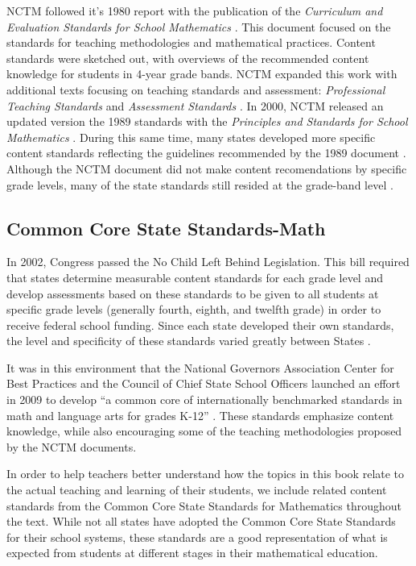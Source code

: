 \documentclass[
]{book}
\theoremstyle{definition}
\theoremstyle{definition}
\theoremstyle{definition}
\theoremstyle{definition}
\theoremstyle{remark}
\begin{document}
NCTM followed it's 1980 report with the publication of the \emph{Curriculum and Evaluation Standards for School Mathematics} \citep{NCTM1989}. This document focused on the standards for teaching methodologies and mathematical practices. Content standards were sketched out, with overviews of the recommended content knowledge for students in 4-year grade bands. NCTM expanded this work with additional texts focusing on teaching standards and assessment: \emph{Professional Teaching Standards} \citeyearpar{NCTM1991} and \emph{Assessment Standards} \citeyearpar{NCTM1995}. In 2000, NCTM released an updated version the 1989 standards with the \emph{Principles and Standards for School Mathematics} \citep{PSSM}. During this same time, many states developed more specific content standards reflecting the guidelines recommended by the 1989 document \citep{Raimi1998}. Although the NCTM document did not make content recomendations by specific grade levels, many of the state standards still resided at the grade-band level \citep[p.~677]{Reys2007}.

\hypertarget{common-core-state-standards-math}{%
\subsection{Common Core State Standards-Math}\label{common-core-state-standards-math}}

In 2002, Congress passed the No Child Left Behind Legislation. This bill required that states determine measurable content standards for each grade level and develop assessments based on these standards to be given to all students at specific grade levels (generally fourth, eighth, and twelfth grade) in order to receive federal school funding. Since each state developed their own standards, the level and specificity of these standards varied greatly between States \citep{Reys2007}.

It was in this environment that the National Governors Association Center for Best Practices and the Council of Chief State School Officers launched an effort in 2009 to develop ``a common core of internationally benchmarked standards in math and language arts for grades K-12'' \citep{CCSS}. These standards emphasize content knowledge, while also encouraging some of the teaching methodologies proposed by the NCTM documents.

In order to help teachers better understand how the topics in this book relate to the actual teaching and learning of their students, we include related content standards from the Common Core State Standards for Mathematics throughout the text. While not all states have adopted the Common Core State Standards for their school systems, these standards are a good representation of what is expected from students at different stages in their mathematical education.
\end{document}
